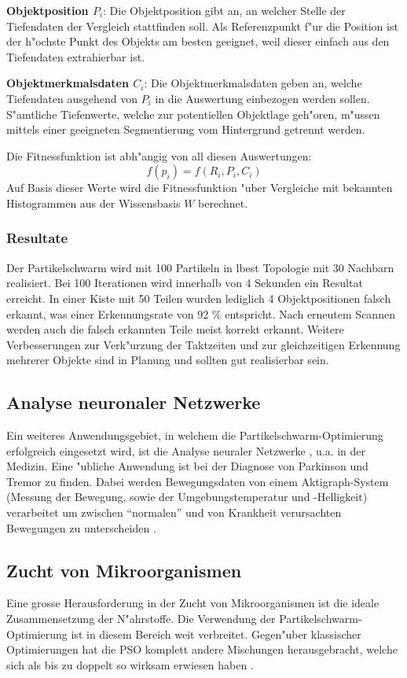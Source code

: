 \textbf{Objektposition $P_i$}: Die Objektposition gibt an, an welcher
Stelle der Tiefendaten der Vergleich stattfinden soll. Als Referenzpunkt
f"ur die Position ist der h"ochste Punkt des Objekts am besten geeignet,
weil dieser einfach aus den Tiefendaten extrahierbar ist. 

\textbf{Objektmerkmalsdaten $C_i$}: Die Objektmerkmalsdaten geben an,
welche Tiefendaten ausgehend von $P_i$ in die Auswertung einbezogen
werden sollen. S"amtliche Tiefenwerte, welche zur potentiellen Objektlage
geh"oren, m"ussen mittels einer geeigneten Segmentierung vom Hintergrund
getrennt werden. 


Die Fitnessfunktion ist abh"angig von all diesen Auswertungen:
\begin{equation}
	f(p_i) = f(R_i,P_i,C_i)
\end{equation}
Auf Basis dieser Werte wird die Fitnessfunktion "uber Vergleiche mit
bekannten Histogrammen aus der Wissensbasis $W$ berechnet.

\subsubsection{Resultate}
Der Partikelschwarm wird mit 100 Partikeln in lbest Topologie mit 30
Nachbarn realisiert. Bei 100 Iterationen wird innerhalb von 4 Sekunden
ein Resultat erreicht. In einer Kiste mit 50 Teilen wurden lediglich
4 Objektpositionen falsch erkannt, was einer Erkennungsrate von 92 \%
entspricht. Nach erneutem Scannen werden auch die falsch erkannten
Teile meist korrekt erkannt. Weitere Verbesserungen zur Verk"urzung der
Taktzeiten und zur gleichzeitigen Erkennung  mehrerer Objekte sind in
Planung und sollten gut realisierbar sein.

\subsection{Analyse neuronaler Netzwerke}
Ein weiteres Anwendungsgebiet, in welchem die Partikelschwarm-Optimierung
erfolgreich eingesetzt wird, ist die Analyse neuraler Netzwerke ,
u.a. in der Medizin. Eine "ubliche Anwendung ist bei der Diagnose
von Parkinson und Tremor zu finden. Dabei werden Bewegungsdaten
von einem Aktigraph-System (Messung der Bewegung, sowie der
Umgebungstemperatur und -Helligkeit) verarbeitet um zwischen
``normalen'' und von Krankheit verursachten Bewegungen zu
unterscheiden \cite{Shi-Appl}.

\subsection{Zucht von Mikroorganismen}
Eine grosse Herausforderung in der Zucht von Mikroorganismen
ist die ideale Zusammensetzung der N"ahrstoffe. Die Verwendung
der Partikelschwarm-Optimierung ist in diesem Bereich weit
verbreitet. Gegen"uber klassischer Optimierungen hat die PSO komplett
andere Mischungen herausgebracht, welche sich als bis zu doppelt so
wirksam erwiesen haben \cite{Shi-Appl}.
